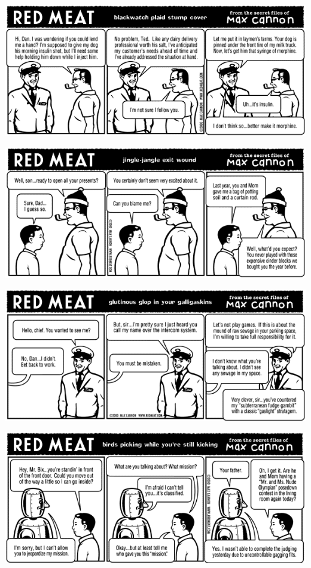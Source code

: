 \documentclass[a4paper,twoside,11pt]{article}
\begin{document}
\includegraphics[width=\textwidth]{redmeat_2000-12-19.png}



\includegraphics[width=\textwidth]{redmeat_2000-12-26.png}



\includegraphics[width=\textwidth]{redmeat_2001-01-02.png}



\includegraphics[width=\textwidth]{redmeat_2001-01-16.png}
\end{document}
